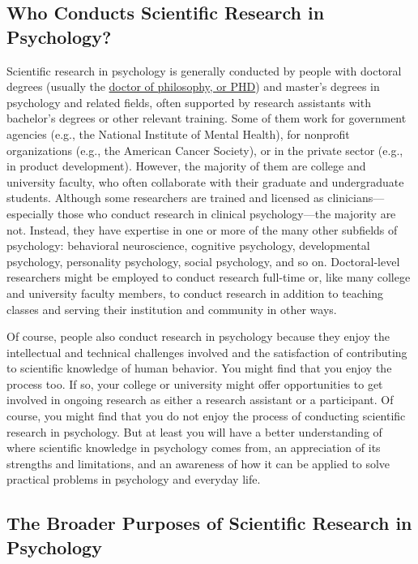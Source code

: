 \documentclass[
]{krantz}
\begin{document}
\hypertarget{who-conducts-scientific-research-in-psychology}{%
\subsection*{Who Conducts Scientific Research in Psychology?}\label{who-conducts-scientific-research-in-psychology}}


Scientific research in psychology is generally conducted by people with doctoral degrees (usually the \protect\hyperlink{doctor-of-philosophy}{doctor of philosophy, or PHD}) and master's degrees in psychology and related fields, often supported by research assistants with bachelor's degrees or other relevant training. Some of them work for government agencies (e.g., the National Institute of Mental Health), for nonprofit organizations (e.g., the American Cancer Society), or in the private sector (e.g., in product development). However, the majority of them are college and university faculty, who often collaborate with their graduate and undergraduate students. Although some researchers are trained and licensed as clinicians---especially those who conduct research in clinical psychology---the majority are not. Instead, they have expertise in one or more of the many other subfields of psychology: behavioral neuroscience, cognitive psychology, developmental psychology, personality psychology, social psychology, and so on. Doctoral-level researchers might be employed to conduct research full-time or, like many college and university faculty members, to conduct research in addition to teaching classes and serving their institution and community in other ways.

Of course, people also conduct research in psychology because they enjoy the intellectual and technical challenges involved and the satisfaction of contributing to scientific knowledge of human behavior. You might find that you enjoy the process too. If so, your college or university might offer opportunities to get involved in ongoing research as either a research assistant or a participant. Of course, you might find that you do not enjoy the process of conducting scientific research in psychology. But at least you will have a better understanding of where scientific knowledge in psychology comes from, an appreciation of its strengths and limitations, and an awareness of how it can be applied to solve practical problems in psychology and everyday life.

\hypertarget{the-broader-purposes-of-scientific-research-in-psychology}{%
\subsection*{The Broader Purposes of Scientific Research in Psychology}\label{the-broader-purposes-of-scientific-research-in-psychology}}
\end{document}
